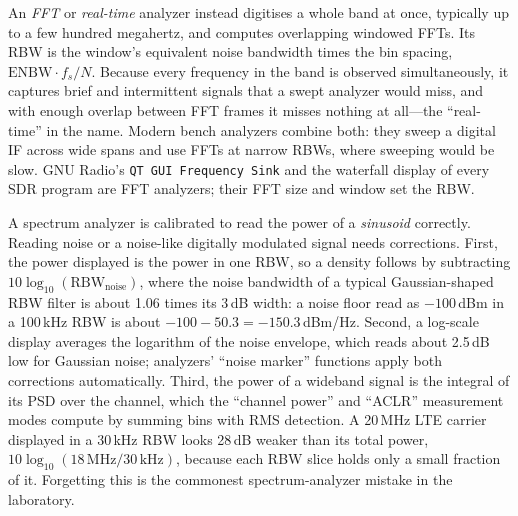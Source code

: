 
An \emph{FFT} or \emph{real-time} analyzer instead digitises a whole band at once, typically up to a
few hundred megahertz, and computes overlapping windowed FFTs. Its RBW is the window's equivalent
noise bandwidth times the bin spacing, $\text{ENBW}\cdot f_s/N$. Because every frequency in the
band is observed simultaneously, it captures brief and intermittent signals that a swept analyzer
would miss, and with enough overlap between FFT frames it misses nothing at all---the ``real-time''
in the name. Modern bench analyzers combine both: they sweep a digital IF across wide spans and use
FFTs at narrow RBWs, where sweeping would be slow. GNU Radio's \texttt{QT GUI Frequency Sink} and the
waterfall display of every SDR program are FFT analyzers; their FFT size and window set the RBW.


\begin{inpractice}
A spectrum analyzer is calibrated to read the power of a \emph{sinusoid} correctly. Reading noise or
a noise-like digitally modulated signal needs corrections. First, the power displayed is the power
in one RBW, so a density follows by subtracting $10\log_{10}(\text{RBW}_{\text{noise}})$, where the
noise bandwidth of a typical Gaussian-shaped RBW filter is about 1.06 times its 3\,dB width: a noise
floor read as $-100$\,dBm in a 100\,kHz RBW is about $-100-50.3=-150.3$\,dBm/Hz. Second, a
log-scale display averages the logarithm of the noise envelope, which reads about 2.5\,dB low for
Gaussian noise; analyzers' ``noise marker'' functions apply both corrections automatically. Third,
the power of a wideband signal is the integral of its PSD over the channel, which the ``channel
power'' and ``ACLR'' measurement modes compute by summing bins with RMS detection. A 20\,MHz LTE
carrier displayed in a 30\,kHz RBW looks 28\,dB weaker than its total power, $10\log_{10}(18\,\text{MHz}/30\,\text{kHz})$,
because each RBW slice holds only a small fraction of it. Forgetting this is the commonest
spectrum-analyzer mistake in the laboratory.
\end{inpractice}

